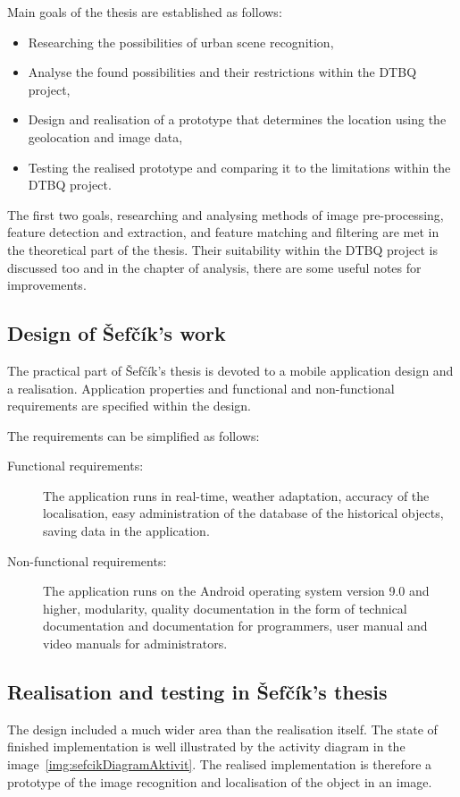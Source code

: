 \documentclass[thesis=B,english]{FITthesis}[2019/12/23]
\begin{document}
        Main goals of the thesis are established as follows:
        \begin{itemize}
            \item Researching the possibilities of urban scene recognition,
            \item Analyse the found possibilities and their restrictions within the DTBQ project,
            \item Design and realisation of a prototype that determines the location using the geolocation and image data,
            \item Testing the realised prototype and comparing it to the limitations within the DTBQ project.
        \end{itemize}
        The first two goals, researching and analysing methods of image pre-processing, feature detection and extraction, and feature matching and filtering are met in the theoretical part of the thesis. Their suitability within the DTBQ project is discussed too and in the chapter of analysis, there are some useful notes for improvements.

        \subsection{Design of Šefčík's work}
        The practical part of Šefčík’s thesis is devoted to a mobile application design and a realisation. Application properties and functional and non-functional requirements are specified within the design.

        The requirements can be simplified as follows:
        \begin{description}
            \item[Functional requirements:] The application runs in real-time, weather adaptation, accuracy of the localisation, easy administration of the database of the historical objects, saving data in the application.
            \item[Non-functional requirements:] The application runs on the Android operating system version 9.0 and higher, modularity, quality documentation in the form of technical documentation and documentation for programmers, user manual and video manuals for administrators.
        \end{description}
        
        \subsection{Realisation and testing in Šefčík's thesis}
        The design included a much wider area than the realisation itself. The state of finished implementation is well illustrated by the activity diagram in the image~\ref{img:sefcikDiagramAktivit}. The realised implementation is therefore a prototype of the image recognition and localisation of the object in an image.
        
\end{document}
